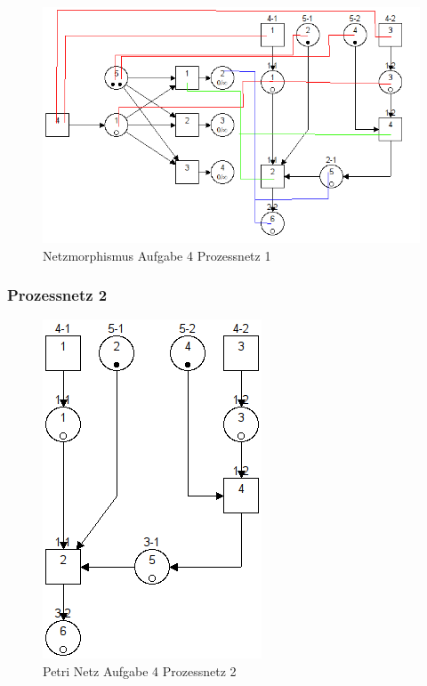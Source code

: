 \documentclass[10pt]{scrartcl}
\begin{document}
			\begin{figure}[H]
    			\centering
				\includegraphics[scale=0.5]{transf1.png}		
            	\caption{Netzmorphismus Aufgabe 4 Prozessnetz 1}
            	\label{petri:aufg4:pro1:morph}
			\end{figure}				
				
		\subsubsection{Prozessnetz 2}
			\begin{figure}[H]
    			\centering
				\includegraphics[]{aufg4Proc2.png}		
            	\caption{Petri Netz Aufgabe 4 Prozessnetz 2}
            	\label{petri:aufg4:pro2}
			\end{figure}		
\end{document}
